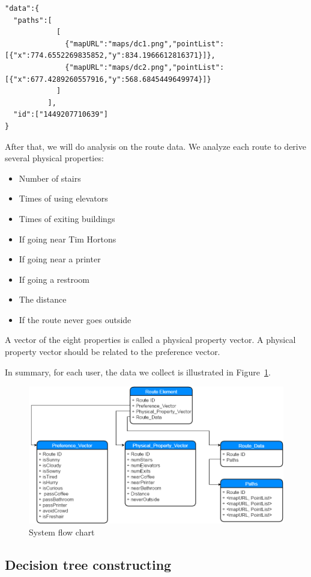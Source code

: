 \documentclass{sigchi}
\begin{document}
\begin{lstlisting}
"data":{
  "paths":[
            [
              {"mapURL":"maps/dc1.png","pointList":[{"x":774.6552269835852,"y":834.1966612816371}]},
              {"mapURL":"maps/dc2.png","pointList":[{"x":677.4289260557916,"y":568.6845449649974}]}
            ]
          ],
  "id":["1449207710639"]
}
\end{lstlisting}

After that, we will do analysis on the route data. We analyze each route to derive several physical properties:
\begin{itemize}
\item Number of stairs
\item Times of using elevators
\item Times of exiting buildings
\item If going near Tim Hortons
\item If going near a printer
\item If going a restroom
\item The distance
\item If the route never goes outside
\end{itemize}

A vector of the eight properties is called a physical property vector. A physical property vector should be related to the preference vector.


In summary, for each user, the data we collect is illustrated in Figure~\ref{fig:element-detail}.

\begin{figure}[!h]
\centering
\includegraphics[width=1.0\columnwidth]{pics/element-detail.png}
\caption{System flow chart}
\label{fig:element-detail}
\end{figure}

\subsection{Decision tree constructing}
\end{document}
